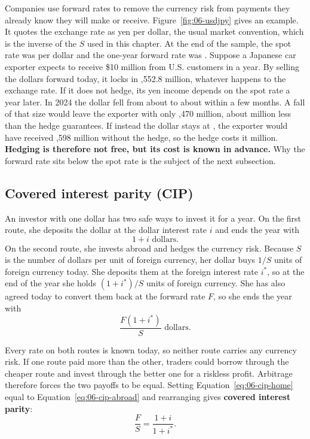 Companies use forward rates to remove the currency risk from payments they already know they will make or receive. Figure~\ref{fig:06-usdjpy} gives an example. It quotes the exchange rate as yen per dollar, the usual market convention, which is the inverse of the $S$ used in this chapter. At the end of the sample, the spot rate was  per dollar and the one-year forward rate was . Suppose a Japanese car exporter expects to receive \$10 million from U.S. customers in a year. By selling the dollars forward today, it locks in ,552.8 million, whatever happens to the exchange rate. If it does not hedge, its yen income depends on the spot rate a year later. In 2024 the dollar fell from about  to about  within a few months. A fall of that size would leave the exporter with only ,470 million, about  million less than the hedge guarantees. If instead the dollar stays at , the exporter would have received ,598 million without the hedge, so the hedge costs it  million. \textbf{Hedging is therefore not free, but its cost is known in advance.} Why the forward rate sits below the spot rate is the subject of the next subsection.


\subsection{Covered interest parity (CIP)}

An investor with one dollar has two safe ways to invest it for a year. On the first route, she deposits the dollar at the dollar interest rate $i$ and ends the year with
\begin{equation}
  1 + i \text{ dollars.}
  \label{eq:06-cip-home}
\end{equation}
On the second route, she invests abroad and hedges the currency risk. Because $S$ is the number of dollars per unit of foreign currency, her dollar buys $1/S$ units of foreign currency today. She deposits them at the foreign interest rate $i^*$, so at the end of the year she holds $(1+i^*)/S$ units of foreign currency. She has also agreed today to convert them back at the forward rate $F$, so she ends the year with
\begin{equation}
  \frac{F(1+i^*)}{S} \text{ dollars.}
  \label{eq:06-cip-abroad}
\end{equation}

Every rate on both routes is known today, so neither route carries any currency risk. If one route paid more than the other, traders could borrow through the cheaper route and invest through the better one for a riskless profit. Arbitrage therefore forces the two payoffs to be equal. Setting Equation~\eqref{eq:06-cip-home} equal to Equation~\eqref{eq:06-cip-abroad} and rearranging gives \textbf{covered interest parity}:
\begin{equation}
  \frac{F}{S} = \frac{1 + i}{1 + i^*}.
  \label{eq:06-cip}
\end{equation}

